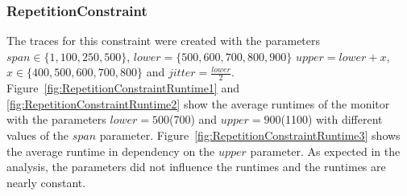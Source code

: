 \subsubsection{RepetitionConstraint}
	The traces for this constraint were created with the parameters $span\in\{1,100,250,500\}$, $lower=\{500,600,700,800,900\}$ $upper=lower+x$, $x\in\{400,500,600,700,800\}$ and $jitter=\frac{lower}{2}$.\\
	Figure~\ref{fig:RepetitionConstraintRuntime1} and \ref{fig:RepetitionConstraintRuntime2} show the average runtimes of the monitor with the parameters $lower=500$(700) and $upper=900$(1100) with different values of the $span$ parameter. Figure~\ref{fig:RepetitionConstraintRuntime3} shows the average runtime in dependency on the $upper$ parameter. As expected in the analysis, the parameters did not influence the runtimes and the runtimes are nearly constant.
